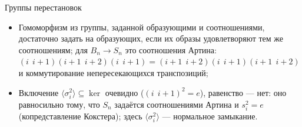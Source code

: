 \documentclass[serif, aspectratio=169]{beamer}
\begin{document}
\begin{frame}{Группы перестановок}
{        \begin{itemize}
            \item Гомоморфизм из группы, заданной образующими и соотношениями, достаточно задать на образующих, если их образы удовлетворяют тем же соотношениям; для $B_n\to S_n$ это соотношения Артина: $(i\ \ i{+}1)(i{+}1\ \ i{+}2)(i\ \ i{+}1)=(i{+}1\ \ i{+}2)(i\ \ i{+}1)(i{+}1\ \ i{+}2)$ и коммутирование непересекающихся транспозиций;
            \item Включение $\langle\sigma_i^2\rangle\subseteq\ker$ очевидно ($(i\ \ i{+}1)^2=e$), равенство --- нет: оно равносильно тому, что $S_n$ задаётся соотношениями Артина и $s_i^2=e$ (копредставление Кокстера); здесь $\langle\sigma_i^2\rangle$ --- нормальное замыкание.
        \end{itemize}
    }
\end{frame}
\end{document}
